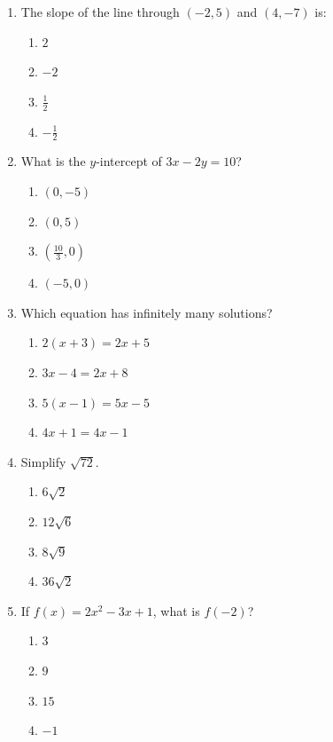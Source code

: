 \documentclass[11pt]{article}
\begin{document}
\begin{enumerate}
\item The slope of the line through $(-2,5)$ and $(4,-7)$ is:
\begin{enumerate}[label=(\Alph*)]
\item $2$ \item $-2$ \item $\frac{1}{2}$ \item $-\frac{1}{2}$
\end{enumerate}

\item What is the $y$-intercept of $3x-2y=10$?
\begin{enumerate}[label=(\Alph*)]
\item $(0,-5)$ \item $(0,5)$ \item $(\frac{10}{3},0)$ \item $(-5,0)$
\end{enumerate}

\item Which equation has infinitely many solutions?
\begin{enumerate}[label=(\Alph*)]
\item $2(x+3)=2x+5$ \item $3x-4=2x+8$ \item $5(x-1)=5x-5$ \item $4x+1=4x-1$
\end{enumerate}

\item Simplify $\sqrt{72}$.
\begin{enumerate}[label=(\Alph*)]
\item $6\sqrt{2}$ \item $12\sqrt{6}$ \item $8\sqrt{9}$ \item $36\sqrt{2}$
\end{enumerate}

\item If $f(x)=2x^2-3x+1$, what is $f(-2)$?
\begin{enumerate}[label=(\Alph*)]
\item $3$ \item $9$ \item $15$ \item $-1$
\end{enumerate}


\end{enumerate}
\end{document}
